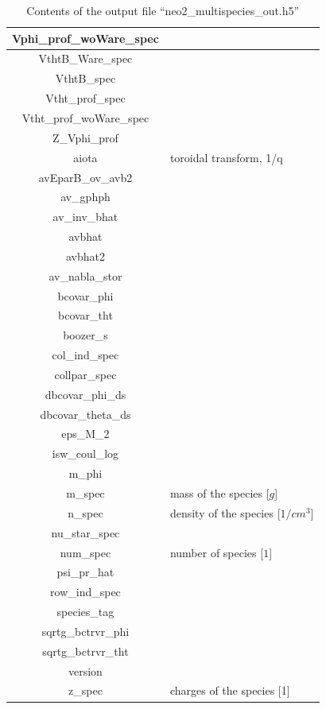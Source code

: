 \begin{table}[h]
\begin{tabular}{|c|l|}
\hline
Vphi\_prof\_woWare\_spec & \\
\hline
VthtB\_Ware\_spec & \\
\hline
VthtB\_spec & \\
\hline
Vtht\_prof\_spec & \\
\hline
Vtht\_prof\_woWare\_spec & \\
\hline
Z\_Vphi\_prof & \\
\hline
aiota & toroidal transform, 1/q \\
\hline
avEparB\_ov\_avb2 & \\
\hline
av\_gphph & \\
\hline
av\_inv\_bhat & \\
\hline
avbhat & \\
\hline
avbhat2 & \\
\hline
av\_nabla\_stor & \\
\hline
bcovar\_phi & \\
\hline
bcovar\_tht & \\
\hline
boozer\_s & \\
\hline
col\_ind\_spec & \\
\hline
collpar\_spec & \\
\hline
dbcovar\_phi\_ds & \\
\hline
dbcovar\_theta\_ds & \\
\hline
eps\_M\_2 & \\
\hline
isw\_coul\_log & \\
\hline
m\_phi & \\
\hline
m\_spec & mass of the species [$g$] \\
\hline
n\_spec & density of the species [$1/cm^3$] \\
\hline
nu\_star\_spec & \\
\hline
num\_spec & number of species [$1$] \\
\hline
psi\_pr\_hat & \\
\hline
row\_ind\_spec & \\
\hline
species\_tag & \\
\hline
sqrtg\_bctrvr\_phi & \\
\hline
sqrtg\_bctrvr\_tht & \\
\hline
version & \\
\hline
z\_spec & charges of the species [1]

\end{tabular}
\caption{Contents of the output file ``neo2\_multispecies\_out.h5''}
\end{table}


